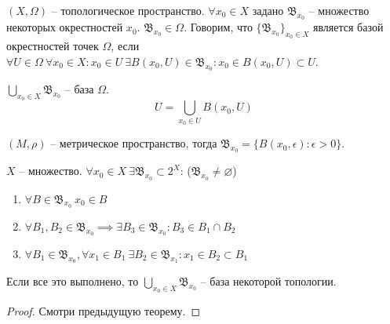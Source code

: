 \documentclass[main]{subfiles}
\begin{document}
\begin{definition}
    $(X, \Omega)$ -- топологическое пространство.
    $\forall x_0 \in X$ задано $\mathfrak{B}_{x_0}$ -- множество некоторых окрестностей $x_0$.
    $\mathfrak{B}_{x_0} \in \Omega$.
    Говорим, что $\{\mathfrak{B}_{x_0}\}_{x_0 \in X}$ является базой окрестностей точек $\Omega$,
    если $\forall U \in \Omega\ \forall x_0 \in X: x_0 \in U\ \exists B(x_0, U) \in \mathfrak{B}_{x_0}:
        x_0 \in B(x_0, U) \subset U$.
\end{definition}
\begin{remark}
    $\bigcup_{x_0 \in X} \mathfrak{B}_{x_0}$ -- база $\Omega$.
    \[U = \bigcup_{x_0 \in U} B(x_0, U)\]
\end{remark}
\begin{example}
    $(M, \rho)$ -- метрическое пространство, тогда $\mathfrak{B}_{x_0} = \{B(x_0, \epsilon) : \epsilon > 0\}$.
\end{example}

\begin{theorem}
    $X$ -- множество. $\forall x_0 \in X\ \exists \mathfrak{B}_{x_0} \subset 2^X$: ($\mathfrak{B}_{x_0} \neq \varnothing$)
    \begin{enumerate}
        \item $\forall B \in \mathfrak{B}_{x_0}\ x_0 \in B$
        \item $\forall B_1, B_2 \in \mathfrak{B}_{x_0} \implies \exists B_3 \in \mathfrak{B}_{x_0}: B_3 \in B_1 \cap B_2$
        \item $\forall B_1 \in \mathfrak{B}_{x_0}, \forall x_1 \in B_1\ \exists B_2 \in \mathfrak{B}_{x_1}: x_1 \in B_2 \subset B_1$
    \end{enumerate}
    Если все это выполнено, то $\bigcup_{x_0 \in X} \mathfrak{B}_{x_0}$ -- база некоторой топологии.
\end{theorem}
\begin{proof}
    Смотри предыдущую теорему.
\end{proof}
\end{document}
